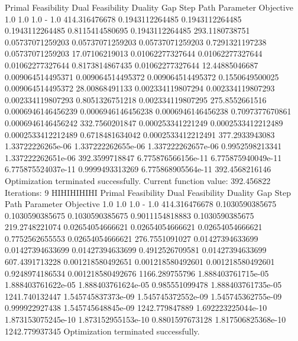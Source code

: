 \documentclass[letterpaper,10pt,english]{sphinxmanual}
\begin{document}
{
\begin{sphinxVerbatim}[commandchars=\\\{\}]
Primal Feasibility  Dual Feasibility    Duality Gap         Step             Path Parameter      Objective
1.0                 1.0                 1.0                 -                1.0                 414.316476678
0.1943112264485     0.1943112264485     0.1943112264485     0.8115414580695  0.1943112264485     293.1180738751
0.05737071259203    0.05737071259203    0.05737071259203    0.7291321197238  0.05737071259203    17.07106219013
0.01062277327644    0.01062277327644    0.01062277327644    0.8173814867435  0.01062277327644    12.44885046687
0.009064514495371   0.009064514495372   0.009064514495372   0.1550649500025  0.009064514495372   28.00868491133
0.002334119807294   0.002334119807293   0.002334119807293   0.8051326751218  0.002334119807295   275.8552661516
0.0006946146456239  0.0006946146456238  0.0006946146456238  0.7097377670861  0.0006946146456242  332.7560201847
0.000253341221249   0.0002533412212489  0.0002533412212489  0.6718481634042  0.0002533412212491  377.2933943083
1.33722226265e-06   1.337222262655e-06  1.337222262657e-06  0.9952598213341  1.337222262651e-06  392.3599718847
6.775876566156e-11  6.775875940049e-11  6.775875524037e-11  0.9999493313269  6.775868905564e-11  392.4568216146
Optimization terminated successfully.
         Current function value: 392.456822
         Iterations: 9
HIHIHIHIHI
Primal Feasibility  Dual Feasibility    Duality Gap         Step             Path Parameter      Objective
1.0                 1.0                 1.0                 -                1.0                 414.316476678
0.1030590385675     0.1030590385675     0.1030590385675     0.9011154818883  0.1030590385675     219.2748221074
0.02654054666621    0.02654054666621    0.02654054666621    0.7752562655553  0.02654054666621    276.7551091027
0.01427394633699    0.01427394633699    0.01427394633699    0.4912526709581  0.01427394633699    607.4391713228
0.001218580492651   0.001218580492601   0.001218580492601   0.9248974186534  0.001218580492676   1166.289755796
1.888403761715e-05  1.888403761622e-05  1.888403761624e-05  0.985551099478   1.888403761735e-05  1241.740132447
1.545745837373e-09  1.545745372552e-09  1.545745362755e-09  0.999922927438   1.545745648845e-09  1242.779847889
1.692223225044e-10  1.873153075245e-10  1.873152955153e-10  0.8801597673128  1.817506825368e-10  1242.779937345
Optimization terminated successfully.

\end{sphinxVerbatim}}
\end{document}
